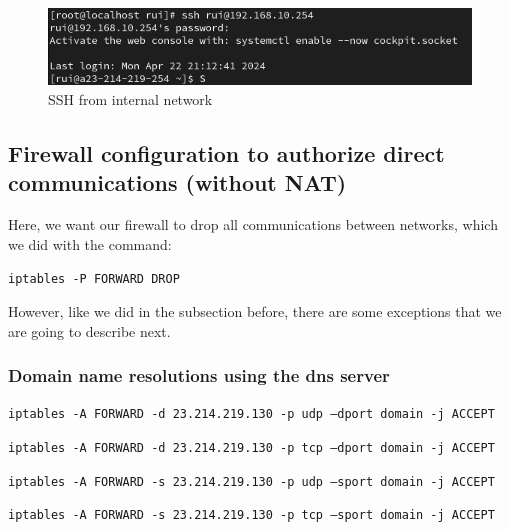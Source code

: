 \documentclass{article}
\begin{document}
\begin{figure}[H]
    \centering
    \includegraphics[scale=0.5]{in/in_ssh_internal.png}
    \caption{SSH from internal network}
    \label{fig:network-arc}
\end{figure}



\subsection{Firewall configuration to authorize direct communications (without NAT)}
\texttt{}\par
Here, we want our firewall to drop all communications between networks, which we did with the command:\par
\texttt{}\par
\texttt{iptables -P FORWARD DROP}\par
\texttt{}\par

However, like we did in the subsection before, there are some exceptions that we are going to describe next.

\subsubsection{Domain name resolutions using the dns server}

\texttt{}\par
\texttt{iptables -A FORWARD -d 23.214.219.130 -p udp --dport domain -j ACCEPT}\par
\texttt{iptables -A FORWARD -d 23.214.219.130 -p tcp --dport domain -j ACCEPT}\par
\texttt{iptables -A FORWARD -s 23.214.219.130 -p udp --sport domain -j ACCEPT}\par
\texttt{iptables -A FORWARD -s 23.214.219.130 -p tcp --sport domain -j ACCEPT}\par
\texttt{}\par
\end{document}
